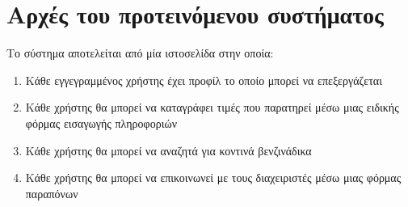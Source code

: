 \section{Αρχές του προτεινόμενου συστήματος}

Το σύστημα αποτελείται από μία ιστοσελίδα στην οποία:
\begin{enumerate}
	\item Κάθε εγγεγραμμένος χρήστης έχει προφίλ το οποίο μπορεί να επεξεργάζεται
	\item Κάθε χρήστης θα μπορεί να καταγράφει τιμές που παρατηρεί μέσω μιας ειδικής φόρμας εισαγωγής πληροφοριών
	\item Κάθε χρήστης θα μπορεί να αναζητά για κοντινά βενζινάδικα
  \item Κάθε χρήστης θα μπορεί να επικοινωνεί με τους διαχειριστές μέσω μιας φόρμας παραπόνων
\end{enumerate}

